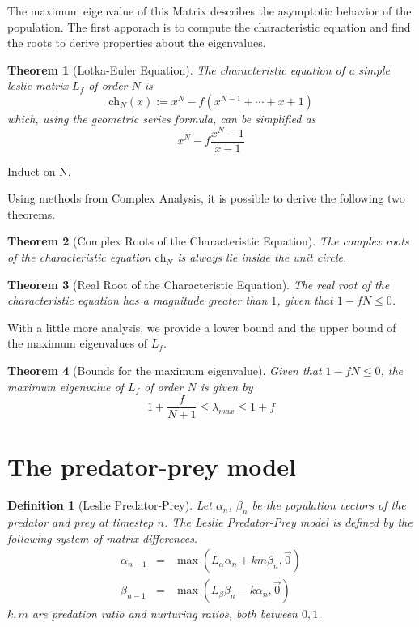 \documentclass{article}
\newtheorem{theorem}{Theorem}
\newtheorem{definition}{Definition}
\newcommand{\ch}{\text{ch}}
\begin{document}
The maximum eigenvalue of this Matrix describes the asymptotic 
behavior of the population. The first apporach is to compute the characteristic 
equation and find the roots to derive properties about the eigenvalues. 

\begin{theorem}[Lotka-Euler Equation]
    \label{LEeq}
    The characteristic equation of a simple leslie matrix $L_f$ of 
    order $N$ is 
    \[
        \ch_N(x):=x^N - f(x^{N-1} + \cdots + x + 1)
    \]
    which, using the geometric series formula, can be simplified as 
    \[
        x^{N} - f \frac {x^N - 1} {x - 1}
    \]
\end{theorem}

\proof Induct on N. 

Using methods from Complex Analysis, it is possible to derive the following 
two theorems. 

\begin{theorem}[Complex Roots of the Characteristic Equation]

    The complex roots of the characteristic equation $\ch_N$ is always 
    lie inside the unit circle. 
\end{theorem}


\begin{theorem}[Real Root of the Characteristic Equation]

    The real root of the characteristic equation has a magnitude greater 
    than $1$, given that $1-fN \leq 0$. 
\end{theorem}



With a little more analysis, we provide a lower bound and the 
upper bound of the maximum eigenvalues of $L_f$. 

\begin{theorem}[Bounds for the maximum eigenvalue]

 Given that $1-fN \leq 0$, the maximum eigenvalue of $L_f$ of order 
 $N$ is given by 
 \[
 1 + \frac f {N + 1} \leq \lambda_{max} \leq 1 + f
 \]
\end{theorem}

\section{The predator-prey model}


\begin{definition}[Leslie Predator-Prey]
Let $\alpha_n$, $\beta_n$ be the population vectors 
of the predator and prey at timestep $n$. The Leslie 
Predator-Prey model is defined by the following 
system of matrix differences. 
\begin{eqnarray}
    \alpha_{n - 1} &=& \max(L_\alpha \alpha_n + k m \beta_n, \vec 0) \\ 
    \beta_{n - 1} &=& \max(L_\beta \beta_n - k \alpha_n, \vec 0) \nonumber
\end{eqnarray}
$k, m$ are predation ratio and nurturing ratios, both between $0, 1$. 
\end{definition}
\end{document}
